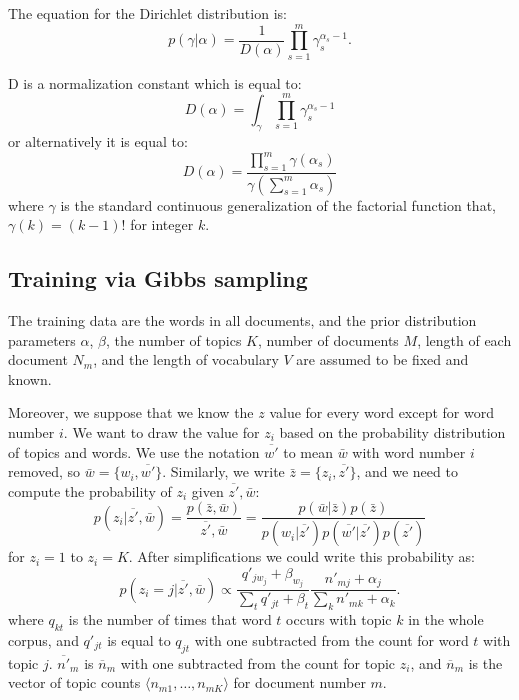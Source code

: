 \documentclass[twoside,12pt]{article}
\begin{document}
The equation for the Dirichlet distribution is:
\begin{equation}
p(\gamma|\alpha)=\frac{1}{D(\alpha)}\prod_{s=1}^{m}\gamma_s^{\alpha_s-1}.
\end{equation}


D is a normalization constant which is equal to:
\begin{equation}
D(\alpha)=\int_{\gamma}\prod_{s=1}^m \gamma_s^{\alpha_s-1}
\end{equation}
or alternatively it is equal to:
\begin{equation}
D(\alpha)=\frac{\prod_{s=1}^m \gamma(\alpha_s)}{\gamma(\sum_{s=1}^{m}\alpha_s)}
\end{equation}
where $\gamma$ is the standard continuous generalization of the factorial function that, $\gamma(k)=(k-1)!$ for integer $k$.
\subsection{Training via Gibbs sampling}
The training data are the words in all documents, and the prior distribution parameters $\alpha$, $\beta$, the number of topics $K$, number of documents $M$, length of each document $N_m$, and the length of vocabulary $V$ are assumed to be fixed and known.

Moreover, we suppose that we know the $z$ value for every word except for word number $i$. We want to draw the value for $z_i$ based on the probability distribution of topics and words. We use the notation $\overline{w'}$ to mean $\bar{w}$ with word number $i$ removed, so $\bar{w}=\{w_i,\overline{w'}\}$. Similarly, we write $\bar{z}=\{z_i,\overline{z'}\}$, and we need to compute the probability of $z_i$ given $\overline{z'},\bar{w}$:
\begin{equation}
p(z_i|\overline{z'},\bar{w})=\frac{p(\bar{z},\bar{w})}{\overline{z'},\bar{w}}=\frac{p(\bar{w}|\bar{z})p(\bar{z})}{p(w_i|\overline{z'})p(\overline{w'}|\overline{z'})p(\overline{z'})}
\end{equation}
for $z_i=1$ to $z_i=K$. After simplifications we could write this probability as:
\begin{equation}
p(z_i=j|\overline{z'},\bar{w})\propto \frac{q'_{jw_j}+\beta_{w_j}}{\sum_t q'_{jt}+\beta_t}\frac{n'_{mj}+\alpha_j}{\sum_k n'_{mk}+\alpha_k}.
\end{equation}
where $q_{kt}$ is the number of times that word $t$ occurs with topic $k$ in the whole corpus, and $q'_{jt}$ is equal to $q_{jt}$ with one subtracted from the count for word $t$ with topic $j$. $\overline{n'}_{m}$ is $\overline{n}_m$ with one subtracted from the count for topic $z_i$, and $\overline{n}_m$ is the vector of topic counts $\langle n_{m1},\ldots,n_{mK} \rangle$ for document number $m$.
\end{document}

